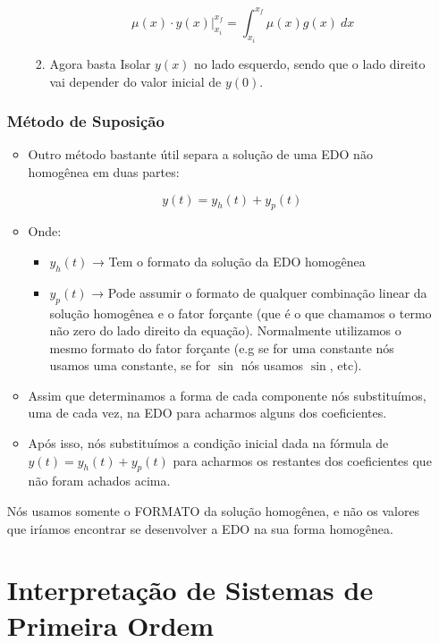 \documentclass{article}
\begin{document}
\begin{itemize}
\begin{itemize}
\begin{enumerate}
    \[
     \mu(x)\cdot y(x) \big |^{x_f}_{x_i} = \int^{x_f}_{x_i}\mu(x)g(x) \ dx
     \]
  \item
    Agora basta Isolar \(y(x)\) no lado esquerdo, sendo que o lado
    direito vai depender do valor inicial de \(y(0)\).
  \end{enumerate}
\end{itemize}

\hypertarget{muxe9todo-de-suposiuxe7uxe3o}{%
\subsubsection{Método de Suposição}\label{muxe9todo-de-suposiuxe7uxe3o}}

\begin{itemize}
\item
  Outro método bastante útil separa a solução de uma EDO não homogênea
  em duas partes:

  \[
    y(t) = y_h(t) + y_p(t)
    \]
\item
  Onde:

  \begin{itemize}
  \tightlist
  \item
    \(y_h(t)\) → Tem o formato da solução da EDO homogênea
  \item
    \(y_p(t)\) → Pode assumir o formato de qualquer combinação linear da
    solução homogênea e o fator forçante (que é o que chamamos o termo
    não zero do lado direito da equação). Normalmente utilizamos o mesmo
    formato do fator forçante (e.g se for uma constante nós usamos uma
    constante, se for \(\sin\) nós usamos \(\sin\), etc).
  \end{itemize}
\item
  Assim que determinamos a forma de cada componente nós substituímos,
  uma de cada vez, na EDO para acharmos alguns dos coeficientes.
\item
  Após isso, nós substituímos a condição inicial dada na fórmula de
  \(y(t) = y_h(t) + y_p(t)\) para acharmos os restantes dos coeficientes
  que não foram achados acima.
\end{itemize}

Nós usamos somente o FORMATO da solução homogênea, e não os valores que
iríamos encontrar se desenvolver a EDO na sua forma homogênea.

\hypertarget{interpretauxe7uxe3o-de-sistemas-de-primeira-ordem}{%
\section{Interpretação de Sistemas de Primeira
Ordem}\label{interpretauxe7uxe3o-de-sistemas-de-primeira-ordem}}


\end{itemize}
\end{document}

